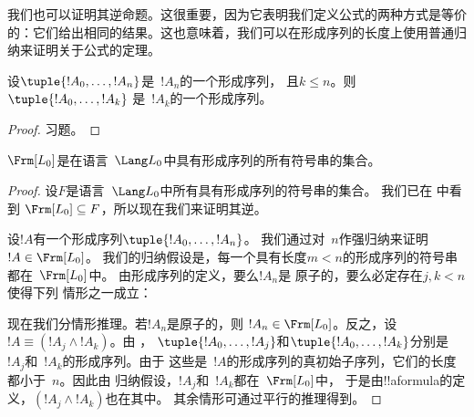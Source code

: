 \documentclass[../../../include/open-logic-section]{subfiles}
\begin{document}
我们也可以证明其逆命题。这很重要，因为它表明我们定义公式的两种方式是等价的：它们给出相同的结果。这也意味着，我们可以在形成序列的长度上使用普通归纳来证明关于公式的定理。

\begin{lem}
设$\tuple{!A_0,\dotsc,!A_n}$是~$!A_n$的一个形成序列，
且$k \leq n$。则$\tuple{!A_0,\dotsc,!A_k}$
是~$!A_k$的一个形成序列。
\end{lem}

\begin{proof}
习题。
\end{proof}

\begin{thm}
$\Frm[L_0]$是在语言~$\Lang L_0$中具有形成序列的所有符号串的集合。
\end{thm}

\begin{proof}
设$F$是语言~$\Lang L_0$中所有具有形成序列的符号串的集合。
我们已在  中看到
$\Frm[L_0] \subseteq F$，所以现在我们来证明其逆。

设$!A$有一个形成序列$\tuple{!A_0,\dotsc,!A_n}$。
我们通过对~$n$作强归纳来证明$!A \in \Frm[L_0]$。
我们的归纳假设是，每一个具有长度$m < n$的形成序列的符号串都在~$\Frm[L_0]$中。
由形成序列的定义，要么$!A_n$是
原子的，要么必定存在$j,k < n$使得下列
情形之一成立：
\begin{enumerate}
\end{enumerate}
现在我们分情形推理。若$!A_n$是原子的，则
$!A_n \in \Frm[L_0]$。反之，设$!A \equiv
(!A_j \land !A_k)$。由 ，
$\tuple{!A_0,\dotsc,!A_j}$和$\tuple{!A_0,\dotsc,!A_k}$分别是
$!A_j$和~$!A_k$的形成序列。由于
这些是~$!A$的形成序列的真初始子序列，它们的长度都小于~$n$。因此由
归纳假设，$!A_j$和~$!A_k$都在~$\Frm[L_0]$中，
于是由!!a{formula}的定义，$(!A_j \land !A_k)$也在其中。
其余情形可通过平行的推理得到。
\end{proof}
\end{document}
